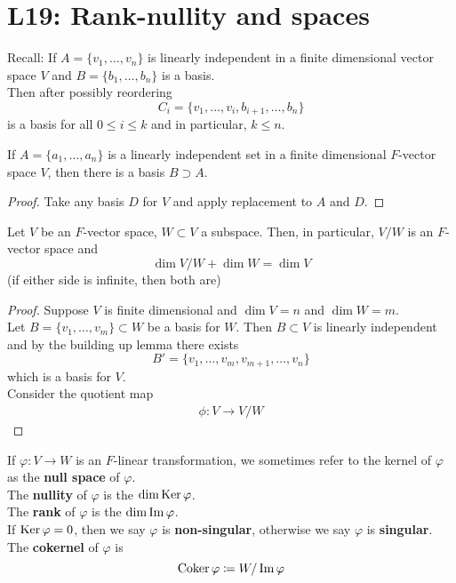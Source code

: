 \documentclass[../Main.tex]{subfiles}
\begin{document}
\chapter{L19: Rank-nullity and spaces}
Recall: If $A=\{v_1,\dots,v_n\}$ is linearly independent in a finite dimensional vector space $V$ and $B=\{b_1,\dots,b_n\}$ is a basis.\\
Then after possibly reordering
\[C_i=\{v_1,\dots,v_i,b_{i+1},\dots,b_n\}\]
is a basis for all $0\le i \le k$ and in particular, $k\le n$.
\begin{crl}
	If $A=\{a_1,\dots,a_n\}$ is a linearly independent set in a finite dimensional $F$-vector space $V$, then there is a basis $B\supset A$.
\end{crl}
\begin{proof}
	Take any basis $D$ for $V$ and apply replacement to $A$ and $D$.
\end{proof}
\begin{thm}
	Let $V$ be an $F$-vector space, $W\subset V$ a subspace. Then, in particular, $V/W$ is an $F$-vector space and \[\dim V/W + \dim W = \dim V\]
	(if either side is infinite, then both are)
\end{thm}
\begin{proof}
	Suppose $V$ is finite dimensional and $\dim V =n$ and $\dim W=m$.\\
	Let $B=\{v_1,\dots,v_m\} \subset W$ be a basis for $W$. Then $B\subset V$ is linearly independent and by the building up lemma there exists
	\[B' = \{v_1,\dots,v_m,v_{m+1},\dots,v_n\}\]
	which is a basis for $V$.\\
	Consider the quotient map
	\begin{align*}\phi\colon V\to V/W 
	\end{align*}
\end{proof}
\begin{dfn}
	If $\varphi\colon V\to W$ is an $F$-linear transformation, we sometimes refer to the kernel of $\varphi$ as the \textbf{null space} of $\varphi$.\\
	The \textbf{nullity} of $\varphi$ is the $\dim \operatorname{Ker} \varphi$.\\
	The \textbf{rank} of $\varphi$ is the $\dim \operatorname{Im} \varphi$.\\
	If $\operatorname{Ker}\varphi = 0$, then we say $\varphi$ is \textbf{non-singular}, otherwise we say $\varphi$ is \textbf{singular}.\\
	The \textbf{cokernel} of $\varphi$ is 
	\[\operatorname{Coker} \varphi\coloneqq W/\operatorname{Im} \varphi \]
\end{dfn}
\end{document}
